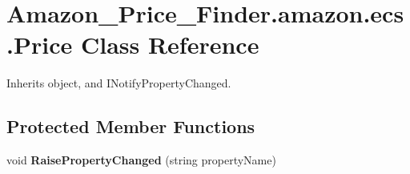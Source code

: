 \hypertarget{class_amazon___price___finder_1_1amazon_1_1ecs_1_1_price}{\section{Amazon\-\_\-\-Price\-\_\-\-Finder.\-amazon.\-ecs.\-Price Class Reference}
\label{class_amazon___price___finder_1_1amazon_1_1ecs_1_1_price}
}


 




Inherits object, and I\-Notify\-Property\-Changed.

\subsection*{Protected Member Functions}
\begin{DoxyCompactItemize}
\item 
\hypertarget{class_amazon___price___finder_1_1amazon_1_1ecs_1_1_price_a4bd03066181c1b17753d947405c1b086}{void {\bfseries Raise\-Property\-Changed} (string property\-Name)}\label{class_amazon___price___finder_1_1amazon_1_1ecs_1_1_price_a4bd03066181c1b17753d947405c1b086}

\end{DoxyCompactItemize}
